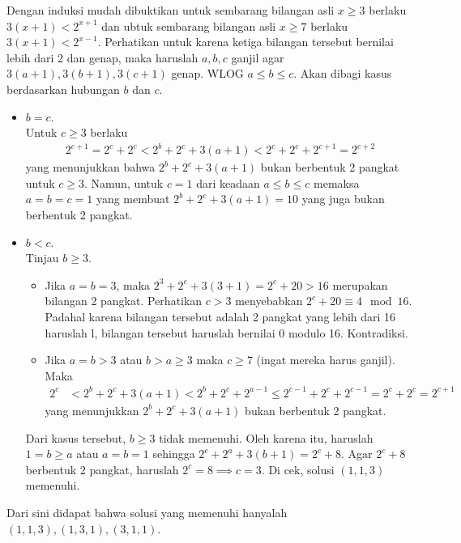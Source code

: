 
\begin{solusi}
    Dengan induksi mudah dibuktikan untuk sembarang bilangan asli $x \ge 3$  berlaku $3(x+1) < 2^{x+1}$ dan ubtuk sembarang bilangan asli $x \ge 7$ berlaku $3(x+1) < 2^{x-1}$. Perhatikan untuk karena ketiga bilangan tersebut bernilai lebih dari 2 dan genap, maka haruslah $a,b,c$ ganjil agar $3(a+1),3(b+1),3(c+1)$ genap.
    WLOG $a \le b \le c$. Akan dibagi kasus berdasarkan hubungan $b$ dan $c$.

    \begin{itemize}
        \item $b = c$.\\
        Untuk $c \ge 3$ berlaku
        \begin{align*}
            2^{c+1} = 2^c + 2^c < 2^b + 2^c + 3(a+1) < 2^c + 2^c +2^{c+1} = 2^{c+2}
        \end{align*}
        yang menunjukkan bahwa $2^b + 2^c + 3(a+1)$ bukan berbentuk 2 pangkat untuk $c \ge 3$. Namun, untuk $c=1$ dari keadaan $a \le b \le c$ memaksa $a=b=c=1$ yang membuat $2^b+2^c+3(a+1)=10$ yang juga bukan berbentuk 2 pangkat.

        \item $b < c$.\\
        Tinjau $b \ge 3$.
        \begin{itemize}
        \item Jika $a=b=3$, maka $2^3+2^c+3(3+1)=2^c+20>16$ merupakan bilangan 2 pangkat. Perhatikan $c>3$ menyebabkan $2^c+20 \equiv 4 \mod 16$. Padahal karena bilangan tersebut adalah 2 pangkat yang lebih dari 16 haruslah l, bilangan tersebut haruslah bernilai 0 modulo 16. Kontradiksi.

        \item Jika $a=b > 3$ atau $b > a \ge 3$ maka $c \ge 7$ (ingat mereka harus ganjil). Maka
        \begin{align*}
            2^{c} &< 2^b + 2^c + 3(a+1)
            < 2^b + 2^c + 2^{a-1} \le 2^{c-1} + 2^c + 2^{c-1} = 2^c + 2^{c} = 2^{c+1}
        \end{align*}
        yang menunjukkan $2^b + 2^c + 3(a+1)$ bukan berbentuk 2 pangkat.
        \end{itemize}
      
        Dari kasus tersebut, $b \ge 3$ tidak memenuhi. Oleh karena itu, haruslah $1 = b \ge a$ atau $a=b=1$ sehingga $2^c+2^a+3(b+1)=2^c+8$. Agar $2^c+8$ berbentuk 2 pangkat, haruslah $2^c=8 \implies c=3$. Di cek, solusi $(1,1,3)$ memenuhi.
    \end{itemize}
    Dari sini didapat bahwa solusi yang memenuhi hanyalah $(1,1,3), (1,3,1), (3,1,1)$.
\end{solusi}